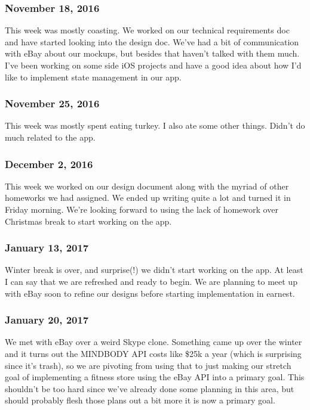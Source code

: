 \subsubsection{November 18, 2016}\label{section}
This week was mostly coasting. We worked on our technical requirements
doc and have started looking into the design doc. We've had a bit of
communication with eBay about our mockups, but besides that haven't
talked with them much. I've been working on some side iOS projects and
have a good idea about how I'd like to implement state management in our
app.

\subsubsection{November 25, 2016}\label{section}
This week was mostly spent eating turkey. I also ate some other things.
Didn't do much related to the app.

\subsubsection{December 2, 2016}\label{section}
This week we worked on our design document along with the myriad of
other homeworks we had assigned. We ended up writing quite a lot and
turned it in Friday morning. We're looking forward to using the lack of
homework over Christmas break to start working on the app.

\subsubsection{January 13, 2017}\label{section}
Winter break is over, and surprise(!) we didn't start working on the app. 
At least I can say that we are refreshed and ready to begin. We are 
planning to meet up with eBay soon to refine our designs before starting 
implementation in earnest.

\subsubsection{January 20, 2017}\label{section}
We met with eBay over a weird Skype clone. Something came up over the 
winter and it turns out the MINDBODY API costs like \$25k a year (which 
is surprising since it's trash), so we are pivoting from using that to 
just making our stretch goal of implementing a fitness store using the 
eBay API into a primary goal. This shouldn't be too hard since we've 
already done some planning in this area, but should probably flesh 
those plans out a bit more it is now a primary goal.

